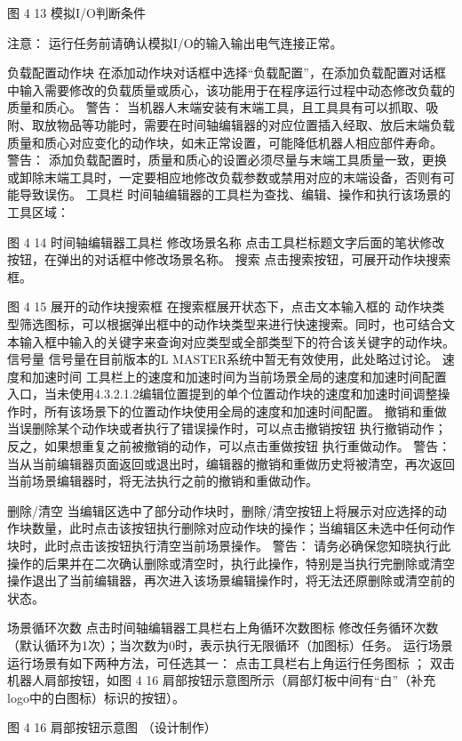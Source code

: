 图 4 13 模拟I/O判断条件

 	注意：
运行任务前请确认模拟I/O的输入输出电气连接正常。

负载配置动作块
在添加动作块对话框中选择“负载配置”，在添加负载配置对话框中输入需要修改的负载质量或质心，该功能用于在程序运行过程中动态修改负载的质量和质心。
 	警告：
当机器人末端安装有末端工具，且工具具有可以抓取、吸附、取放物品等功能时，需要在时间轴编辑器的对应位置插入经取、放后末端负载质量和质心对应变化的动作块，如未正常设置，可能降低机器人相应部件寿命。
 	警告：
添加负载配置时，质量和质心的设置必须尽量与末端工具质量一致，更换或卸除末端工具时，一定要相应地修改负载参数或禁用对应的末端设备，否则有可能导致误伤。
工具栏
时间轴编辑器的工具栏为查找、编辑、操作和执行该场景的工具区域：

图 4 14 时间轴编辑器工具栏
修改场景名称
点击工具栏标题文字后面的笔状修改按钮，在弹出的对话框中修改场景名称。
搜索
点击搜索按钮，可展开动作块搜索框。

图 4 15 展开的动作块搜索框
在搜索框展开状态下，点击文本输入框的 动作块类型筛选图标，可以根据弹出框中的动作块类型来进行快速搜索。同时，也可结合文本输入框中输入的关键字来查询对应类型或全部类型下的符合该关键字的动作块。
信号量
信号量在目前版本的L MASTER系统中暂无有效使用，此处略过讨论。
速度和加速时间
工具栏上的速度和加速时间为当前场景全局的速度和加速时间配置入口，当未使用4.3.2.1.2编辑位置提到的单个位置动作块的速度和加速时间调整操作时，所有该场景下的位置动作块使用全局的速度和加速时间配置。
撤销和重做
当误删除某个动作块或者执行了错误操作时，可以点击撤销按钮 执行撤销动作；反之，如果想重复之前被撤销的动作，可以点击重做按钮 执行重做动作。
 	警告：
当从当前编辑器页面返回或退出时，编辑器的撤销和重做历史将被清空，再次返回当前场景编辑器时，将无法执行之前的撤销和重做动作。

删除/清空
当编辑区选中了部分动作块时，删除/清空按钮上将展示对应选择的动作块数量，此时点击该按钮执行删除对应动作块的操作；当编辑区未选中任何动作块时，此时点击该按钮执行清空当前场景操作。
 	警告：
请务必确保您知晓执行此操作的后果并在二次确认删除或清空时，执行此操作，特别是当执行完删除或清空操作退出了当前编辑器，再次进入该场景编辑操作时，将无法还原删除或清空前的状态。

场景循环次数
点击时间轴编辑器工具栏右上角循环次数图标 修改任务循环次数（默认循环为1次）；当次数为0时，表示执行无限循环（加图标）任务。
运行场景
运行场景有如下两种方法，可任选其一：
点击工具栏右上角运行任务图标 ；
双击机器人肩部按钮，如图 4 16 肩部按钮示意图所示（肩部灯板中间有“白”（补充logo中的白图标）标识的按钮）。


图 4 16 肩部按钮示意图
（设计制作）

